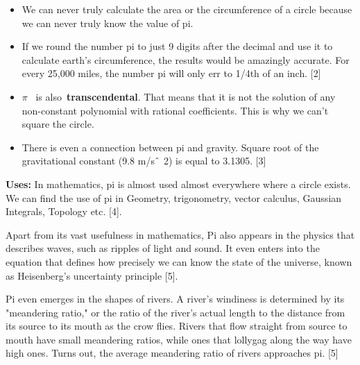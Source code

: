 \documentclass[12pt]{article}
\begin{document}
\begin{itemize}
	\item We can never truly calculate the area or the circumference of a circle because we can never truly know the value of pi.\par

	\item If we round the number pi to just 9 digits after the decimal and use it to calculate earth’s circumference, the results would be amazingly accurate. For every 25,000 miles, the number pi will only err to 1/4th of an inch. [2]\par

	\item $ \pi $  is also \textbf{transcendental}. That means that it is not the solution of any non-constant polynomial with rational coefficients. This is why we can't square the circle.\par

	\item There is even a connection between pi and gravity. Square root of the gravitational constant (9.8 m/s$ \string^ $ 2) is equal to 3.1305. [3] 
\end{itemize}\par

\begin{justify}
\textbf{Uses: }In mathematics, pi is almost used almost everywhere where a circle exists. We can find the use of pi in Geometry, trigonometry, vector calculus, Gaussian Integrals, Topology etc. [4].
\end{justify}\par

\begin{justify}
Apart from its vast usefulness in mathematics, Pi also appears in the physics that describes waves, such as ripples of light and sound. It even enters into the equation that defines how precisely we can know the state of the universe, known as Heisenberg's uncertainty principle [5].
\end{justify}\par

\begin{justify}
Pi even emerges in the shapes of rivers. A river's windiness is determined by its "meandering ratio," or the ratio of the river's actual length to the distance from its source to its mouth as the crow flies. Rivers that flow straight from source to mouth have small meandering ratios, while ones that lollygag along the way have high ones. Turns out, the average meandering ratio of rivers approaches pi. [5]
\end{justify}\par


\printbibliography
\end{document}
